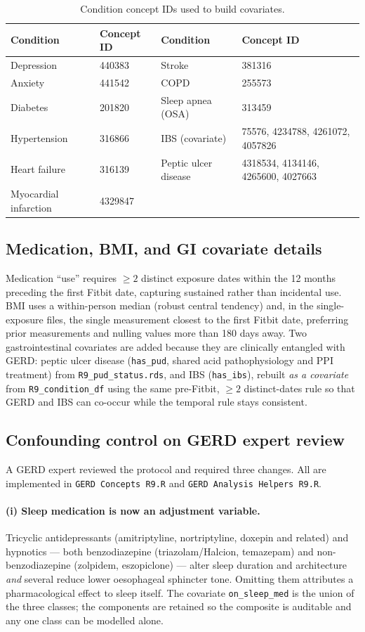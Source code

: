 \documentclass[11pt]{article}
\newcommand{\code}[1]{\texttt{\small #1}}
\begin{document}
\begin{table}[h]
\centering
\footnotesize
\begin{tabular}{@{}l l | l l@{}}
\toprule
\textbf{Condition} & \textbf{Concept ID} & \textbf{Condition} & \textbf{Concept ID} \\
\midrule
Depression & 440383 & Stroke & 381316 \\
Anxiety & 441542 & COPD & 255573 \\
Diabetes & 201820 & Sleep apnea (OSA) & 313459 \\
Hypertension & 316866 & IBS (covariate) & 75576, 4234788, 4261072, 4057826 \\
Heart failure & 316139 & Peptic ulcer disease & 4318534, 4134146, 4265600, 4027663 \\
Myocardial infarction & 4329847 & & \\
\bottomrule
\end{tabular}
\caption{Condition concept IDs used to build covariates.}
\end{table}

\subsection{Medication, BMI, and GI covariate details}
Medication ``use'' requires $\geq 2$ distinct exposure dates within the 12 months preceding the first
Fitbit date, capturing sustained rather than incidental use. BMI uses a within-person median (robust
central tendency) and, in the single-exposure files, the single measurement closest to the first Fitbit
date, preferring prior measurements and nulling values more than 180 days away. Two gastrointestinal
covariates are added because they are clinically entangled with GERD: peptic ulcer disease
(\code{has_pud}, shared acid pathophysiology and PPI treatment) from \code{R9_pud_status.rds}, and IBS
(\code{has_ibs}), rebuilt \emph{as a covariate} from \code{R9_condition_df} using the same pre-Fitbit,
$\geq 2$ distinct-dates rule so that GERD and IBS can co-occur while the temporal rule stays consistent.


\subsection{Confounding control on GERD expert review}
A GERD expert reviewed the protocol and required three changes. All are
implemented in \code{GERD Concepts R9.R} and \code{GERD Analysis Helpers R9.R}.

\paragraph{(i) Sleep medication is now an adjustment variable.}
Tricyclic antidepressants (amitriptyline, nortriptyline, doxepin and related)
and hypnotics --- both benzodiazepine (triazolam/Halcion, temazepam) and
non-benzodiazepine (zolpidem, eszopiclone) --- alter sleep duration and
architecture \emph{and} several reduce lower oesophageal sphincter tone. Omitting
them attributes a pharmacological effect to sleep itself. The covariate
\code{on\_sleep\_med} is the union of the three classes; the components are
retained so the composite is auditable and any one class can be modelled alone.
\end{document}
